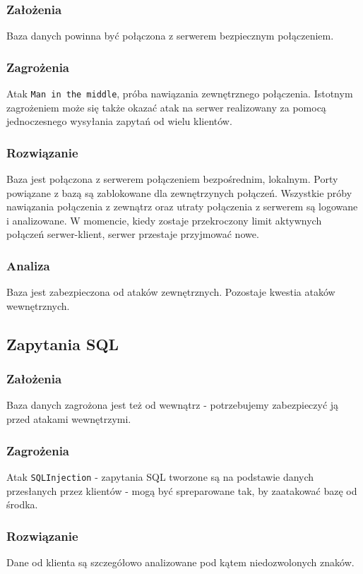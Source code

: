 \documentclass[pdftex,13pt,a4paper]{article}
\begin{document}
\subsubsection{Założenia}
Baza danych powinna być połączona z serwerem bezpiecznym połączeniem. 

\subsubsection{Zagrożenia}
Atak \texttt{Man in the middle}, próba nawiązania zewnętrznego połączenia. Istotnym zagrożeniem
może się także okazać atak na serwer realizowany za pomocą jednoczesnego wysyłania zapytań
od wielu klientów.

\subsubsection{Rozwiązanie}
Baza jest połączona z serwerem połączeniem bezpośrednim, lokalnym. Porty powiązane z bazą są zablokowane dla zewnętrzynych połączeń. Wszystkie próby nawiązania połączenia z zewnątrz oraz utraty połączenia z serwerem są logowane i analizowane.
W momencie, kiedy zostaje przekroczony limit aktywnych połączeń serwer-klient, serwer przestaje przyjmować nowe.

\subsubsection{Analiza}
Baza jest zabezpieczona od ataków zewnętrznych. Pozostaje kwestia ataków wewnętrznych.

\subsection{Zapytania SQL}

\subsubsection{Założenia}
Baza danych zagrożona jest też od wewnątrz - potrzebujemy zabezpieczyć ją przed atakami wewnętrzymi.

\subsubsection{Zagrożenia}
Atak \texttt{SQLInjection} - zapytania SQL tworzone są na podstawie danych przesłanych przez klientów - mogą być spreparowane tak, by zaatakować bazę od środka.

\subsubsection{Rozwiązanie}
Dane od klienta są szczegółowo analizowane pod kątem niedozwolonych znaków.
\end{document}
